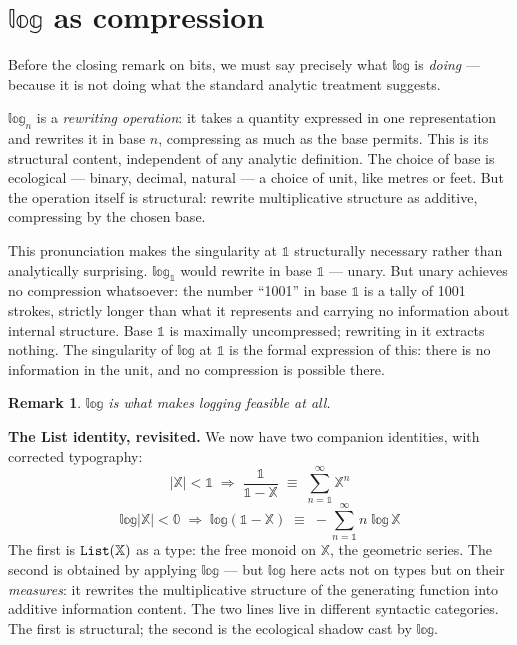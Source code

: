 \documentclass[11pt, a4paper]{article}
\theoremstyle{pearlstyle}
\newtheorem*{remark}{Remark}
\newcommand{\bone}{\mathbb{1}}
\newcommand{\bzero}{\mathbb{0}}
\begin{document}
\section{$\mathbb{log}$ as compression}

Before the closing remark on bits, we must say precisely what $\mathbb{log}$
is \emph{doing} --- because it is not doing what the standard analytic treatment
suggests.

$\mathbb{log}_n$ is a \emph{rewriting operation}: it takes a quantity expressed
in one representation and rewrites it in base $n$, compressing as much as the
base permits. This is its structural content, independent of any analytic
definition. The choice of base is ecological --- binary, decimal, natural --- a
choice of unit, like metres or feet. But the operation itself is structural:
rewrite multiplicative structure as additive, compressing by the chosen base.

This pronunciation makes the singularity at $\bone$ structurally necessary
rather than analytically surprising. $\mathbb{log}_{\bone}$ would rewrite in
base $\bone$ --- unary. But unary achieves no compression whatsoever: the number
``1001'' in base $\bone$ is a tally of 1001 strokes, strictly longer than what
it represents and carrying no information about internal structure. Base $\bone$
is maximally uncompressed; rewriting in it extracts nothing. The singularity of
$\mathbb{log}$ at $\bone$ is the formal expression of this: there is no
information in the unit, and no compression is possible there.

\begin{remark}
$\mathbb{log}$ is what makes logging feasible at all.
\end{remark}

\medskip\noindent\textbf{The List identity, revisited.} We now have two
companion identities, with corrected typography:
\[
  |\mathbb{X}| < \bone \;\Rightarrow\;
  \frac{\bone}{\bone - \mathbb{X}} \;\equiv\; \sum_{n=\bone}^{\infty} \mathbb{X}^n
\]
\[
  \mathbb{log}|\mathbb{X}| < \bzero \;\Rightarrow\;
  \mathbb{log}(\bone - \mathbb{X}) \;\equiv\;
  -\sum_{n=\bone}^{\infty} n\; \mathbb{log}\, \mathbb{X}
\]
The first is ${\tt List}(\mathbb{X})$ as a type: the free monoid on $\mathbb{X}$,
the geometric series. The second is obtained by applying $\mathbb{log}$ ---
but $\mathbb{log}$ here acts not on types but on their \emph{measures}: it
rewrites the multiplicative structure of the generating function into additive
information content. The two lines live in different syntactic categories. The
first is structural; the second is the ecological shadow cast by
$\mathbb{log}$.
\end{document}
